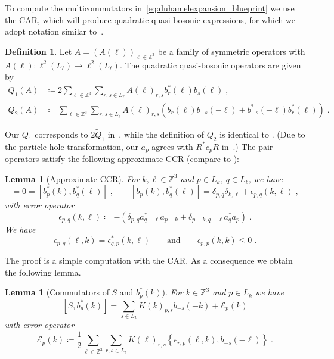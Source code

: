 \documentclass[12pt,a4paper]{article}
\numberwithin{equation}{section}
\newcommand{\1}{\mathbb{I}}
\newcommand{\Zstar}{\mathbb{Z}^3} %
\newcommand{\Z}{\mathbb{Z}}
\theoremstyle{plain}
\newtheorem{lemma}[theorem]{Lemma}
\theoremstyle{definition}
\newtheorem{definition}[theorem]{Definition}
\theoremstyle{remark}
\theoremstyle{plain}
\theoremstyle{definition}
\theoremstyle{remark}
\begin{document}
To compute the multicommutators in~\eqref{eq:duhamelexpansion_blueprint} we use the CAR, which will produce quadratic quasi-bosonic expressions, for which we adopt notation similar to~\cite{CHN21}.

\begin{definition} \label{def:Q}
Let $A=(A(\ell))_{\ell \in \Zstar} $ be a family of symmetric operators with $A(\ell): \ell^2(L_\ell)\rightarrow \ell^2(L_\ell)$. The quadratic quasi-bosonic operators are given by
\begin{equation} %
\begin{aligned}
	Q_1(A)&\coloneq 2 \sum_{\ell \in \Zstar}\sum_{r,s \in L_{\ell}}A(\ell)_{r,s} b^*_r(\ell)b_{s}(\ell) \;,\\
	Q_2(A)&\coloneq \sum_{\ell \in \Zstar}\sum_{r,s \in L_{\ell}}A(\ell)_{r,s} \left(b_r(\ell)b_{-s}(-\ell)+b^*_{-s}(-\ell)b^*_{r}(\ell)\right) \;.
\end{aligned}
\end{equation} 
\end{definition}
Our $ Q_1 $ corresponds to $ 2 \tilde Q_1 $ in~\cite{CHN21}, while the definition of $ Q_2 $ is identical to \cite{CHN21}. (Due to the particle-hole transformation, our $ a_p $ agrees with $ R^* c_p R $ in~\cite{CHN21,CHN23,CHN24}.) The pair operators satisfy the following approximate CCR (compare to \cite[(1.66)]{CHN21}):

\begin{lemma}[Approximate CCR]\label{lem:paircomm}
For $k,\ell \in \Zstar$ and $p \in L_{k}$, $q\in L_{\ell}$, we have
\begin{equation}
	[b_{p}(k),b_{q}(\ell)]
	= 0 = [b^*_{p}(k),b^*_{q}(\ell)]  \;, \qquad
	[b_{p}(k),b^*_{q}(\ell)]
	= \delta_{p,q}\delta_{k,\ell} + \epsilon_{p,q}(k,\ell) \;,
\end{equation}
 with error operator
\begin{equation}
	\epsilon_{p,q}(k,\ell)
	\coloneq -\left(\delta_{p,q}a^*_{q-\ell}a_{p-k} + \delta_{p-k,q-\ell}a^*_{q}a_{p}\right) \;.
\end{equation}
We have
\begin{equation}
\epsilon_{p,q}(\ell,k) = \epsilon^*_{q,p}(k,\ell) \qquad \text{and} \qquad \epsilon_{p,p}(k,k)\leq 0 \;.
\end{equation}
\end{lemma}
The proof is a simple computation with the CAR. As a consequence we obtain the following lemma.

\begin{lemma}[Commutators of $S $ and $b^*_p(k)$]
For $k \in \Zstar$ and $p \in L_k$ we have
\begin{equation} \label{eq:comm_Kb}
	[S, b^*_p(k)]
	= \sum_{s\in L_{k}}K(k)_{p,s}b_{-s}(-k)
		+ \mathcal{E}_{p}(k)
\end{equation}
with error operator
\begin{equation}\label{eq:commerrKb}
	\mathcal{E}_{p}(k)
	\coloneq \frac{1}{2}\sum_{\ell\in \Zstar}\sum_{r,s\in L_\ell}K(\ell)_{r,s}\left\{\epsilon_{r,p}(\ell,k),b_{-s}(-\ell)\right\} \;.
\end{equation}
\end{lemma}
\end{document}
